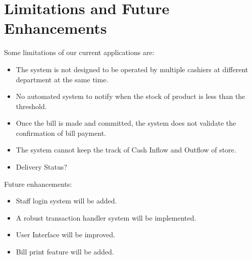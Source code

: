 \section{Limitations and Future Enhancements}

Some limitations of our current applications are:
\begin{itemize}[topsep=0pt]
  \item The system is not designed to be operated by multiple cashiers at
    different department at the same time.
  \item No automated system to notify when the stock of product is less than
    the threshold.
  \item Once the bill is made and committed, the system does not validate the
    confirmation of bill payment.
  \item The system cannot keep the track of Cash Inflow and Outflow of store.
  \item Delivery Status?
\end{itemize}

Future enhancements:
\begin{itemize}[topsep=0pt]
  \item Staff login system will be added.
  \item A robust transaction handler system will be implemented.
  \item User Interface will be improved.
  \item Bill print feature will be added.
\end{itemize}
